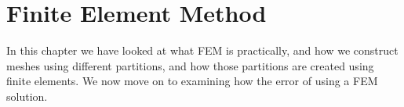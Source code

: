 \chapter{Finite Element Method}



In this chapter we have looked at what FEM is practically, and how we construct 
meshes using different partitions, and how those partitions are created using 
finite elements. We now move on to examining how the error of using a 
FEM solution.